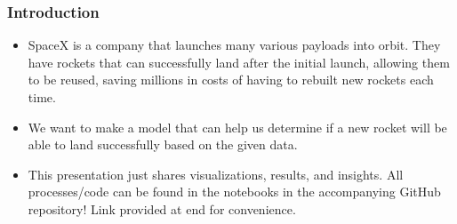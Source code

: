 \documentclass{beamer}
\begin{document}
















\begin{frame}
\frametitle{Introduction}

\begin{itemize}

\item SpaceX is a company that launches many various payloads into orbit. They have rockets that can successfully land after the initial launch, allowing them to be reused, saving millions in costs of having to rebuilt new rockets each time.


\bigskip

\item We want to make a model that can help us determine if a new rocket will be able to land successfully based on the given data.

\bigskip

\item This presentation just shares visualizations, results, and insights. All processes/code can be found in the notebooks in the accompanying GitHub repository! Link provided at end for convenience.

\end{itemize}


\end{frame}
\end{document}
